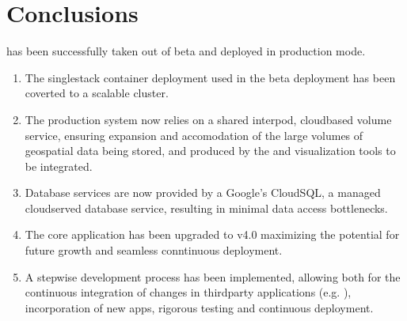 \documentclass[letterpaper,12pt,english,openany,oneside]{sphinxmanual}
\begin{document}
\section{Conclusions}
\label{\detokenize{euidev/conclusions/index:conclusions}}\label{\detokenize{euidev/conclusions/index::doc}}
\sphinxAtStartPar
{} has been successfully taken out of beta and deployed in production mode.
\begin{enumerate}
%
\item {} 
\sphinxAtStartPar
The single\sphinxhyphen{}stack  container deployment used in the beta deployment has been coverted to a scalable  cluster.

\item {} 
\sphinxAtStartPar
The production system now relies on a shared inter\sphinxhyphen{}pod, cloud\sphinxhyphen{}based  volume service, ensuring expansion and accomodation of the large volumes of geospatial data being stored, and produced by the  and visualization tools to be integrated.

\item {} 
\sphinxAtStartPar
Database services are now provided by a Google’s CloudSQL, a managed cloud\sphinxhyphen{}served database service, resulting in minimal data access bottle\sphinxhyphen{}necks.

\item {} 
\sphinxAtStartPar
The core  application has been upgraded to v4.0 maximizing the potential for future growth and seamless conntinuous deployment.

\item {} 
\sphinxAtStartPar
A step\sphinxhyphen{}wise development process has been implemented, allowing both for the continuous integration of changes in third\sphinxhyphen{}party applications (e.g. ), incorporation of new  apps, rigorous testing and continuous deployment.

\end{enumerate}
\end{document}
